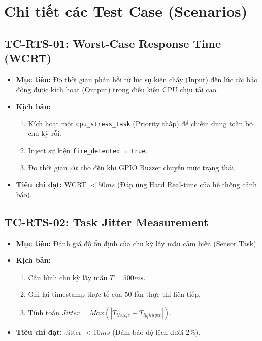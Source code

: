 \documentclass[12pt,a4paper]{report}
\begin{document}
\section{Chi tiết các Test Case (Scenarios)}

\subsection{TC-RTS-01: Worst-Case Response Time (WCRT)}
\begin{itemize}
    \item \textbf{Mục tiêu:} Đo thời gian phản hồi từ lúc sự kiện cháy (Input) đến lúc còi báo động được kích hoạt (Output) trong điều kiện CPU chịu tải cao.
    \item \textbf{Kịch bản:} 
        \begin{enumerate}
            \item Kích hoạt một \texttt{cpu\_stress\_task} (Priority thấp) để chiếm dụng toàn bộ chu kỳ rỗi.
            \item Inject sự kiện \texttt{fire_detected = true}.
            \item Đo thời gian $\Delta t$ cho đến khi GPIO Buzzer chuyển mức trạng thái.
        \end{enumerate}
    \item \textbf{Tiêu chí đạt:} WCRT $< 50ms$ (Đáp ứng Hard Real-time của hệ thống cảnh báo).
\end{itemize}

\subsection{TC-RTS-02: Task Jitter Measurement}
\begin{itemize}
    \item \textbf{Mục tiêu:} Đánh giá độ ổn định của chu kỳ lấy mẫu cảm biến (Sensor Task).
    \item \textbf{Kịch bản:}
        \begin{enumerate}
            \item Cấu hình chu kỳ lấy mẫu $T = 500ms$.
            \item Ghi lại timestamp thực tế của 50 lần thực thi liên tiếp.
            \item Tính toán $Jitter = Max(|T_{thuc_te} - T_{ly_thuyet}|)$.
        \end{enumerate}
    \item \textbf{Tiêu chí đạt:} Jitter $< 10ms$ (Đảm bảo độ lệch dưới 2\%).
\end{itemize}
\end{document}
